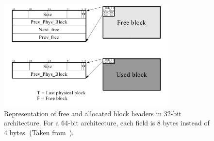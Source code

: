 \begin{figure}[h]
    \centering
    \includegraphics[width=0.80\textwidth]{figures/blockheader_reference.png}
    \caption{Representation of free and allocated block headers in 32-bit architecture. For a 64-bit architecture, each field is 8 bytes instead of 4 bytes. (Taken from~\cite{TLSF}).}
    \label{fig:blockheader_reference}
\end{figure}

